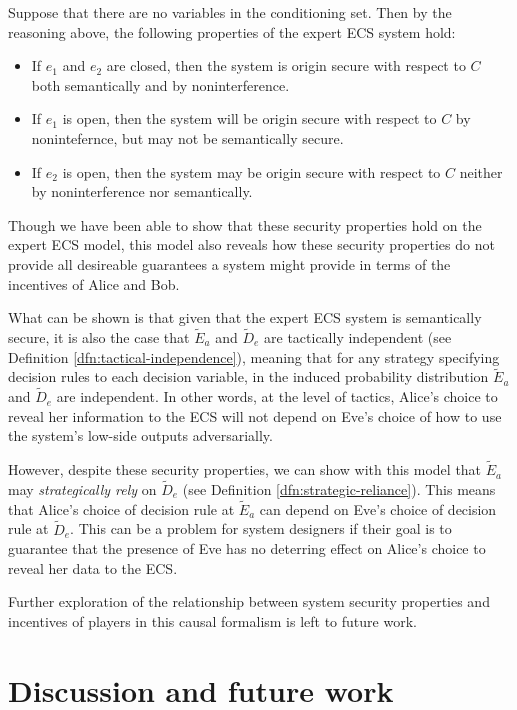 \documentclass[../thesis.tex]{subfiles}
\begin{document}
Suppose that there are no variables in the conditioning
set.
Then by the reasoning above, the following properties
of the expert ECS system hold:
\begin{itemize}
\item If $e_1$ and $e_2$ are closed, then the system is
  origin secure with respect to $C$ both semantically
  and by noninterference.
\item If $e_1$ is open, then the system will be origin
  secure with respect to $C$ by nonintefernce, but may not
  be semantically secure.
\item If $e_2$ is open, then the system may be origin secure
  with respect to $C$ neither by noninterference nor semantically.
\end{itemize}

Though we have been able to show that these security
properties hold on the expert ECS model, this model
also reveals how these security properties do not
provide all desireable guarantees a system might
provide in terms of the incentives of Alice and Bob.

What can be shown is that given that the expert ECS
system is semantically secure, it is also the case
that $\tilde{E}_a$ and $\tilde{D}_e$ are tactically
independent (see Definition \ref{dfn:tactical-independence}),
meaning that for any strategy specifying decision rules
to each decision variable, in the induced probability
distribution $\tilde{E}_a$ and $\tilde{D}_e$ are independent.
In other words, at the level of tactics, Alice's choice to
reveal her information to the ECS will not depend on Eve's
choice of how to use the system's low-side outputs
adversarially.

However, despite these security properties,
we can show with this model that $\tilde{E}_a$
may \emph{strategically rely} on $\tilde{D}_e$
(see Definition \ref{dfn:strategic-reliance}).
This means that Alice's choice of decision rule 
at $\tilde{E}_a$ can depend on Eve's choice of
decision rule at $\tilde{D}_e$.
This can be a problem for system designers if
their goal is to guarantee that the presence of
Eve has no deterring effect on Alice's choice
to reveal her data to the ECS.

Further exploration of the relationship between
system security properties and incentives of
players in this causal formalism is left to
future work.

\section{Discussion and future work}
\label{sec:future}
\end{document}
